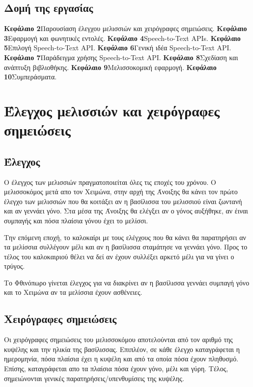 \documentclass[oneside, 12pt]{book}
\begin{document}
\section{Δομή της εργασίας}\label{sec:δομή-της-εργασίας}
\noindent
\textbf{Κεφάλαιο 2}\quad Παρουσίαση έλεγχου μελισσιών και χειρόγραφες σημειώσεις.\newline
\textbf{Κεφάλαιο 3}\quad Εφαρμογή και φωνητικές εντολές.\newline
\textbf{Κεφάλαιο 4}\quad Speech-to-Text APIs.\newline
\textbf{Κεφάλαιο 5}\quad Επιλογή Speech-to-Text API.\newline
\textbf{Κεφάλαιο 6}\quad Γενική ιδέα Speech-to-Text API.\newline
\textbf{Κεφάλαιο 7}\quad Παράδειγμα χρήσης Speech-to-Text API.\newline
\textbf{Κεφάλαιο 8}\quad Σχεδίαση και ανάπτυξη βιβλιοθήκης.\newline
\textbf{Κεφάλαιο 9}\quad Μελισσοκομική εφαρμογή.\newline
\textbf{Κεφάλαιο 10}\quad Συμπεράσματα.

\chapter{Έλεγχος μελισσιών και χειρόγραφες σημειώσεις}
\label{ch:έλεγχος-μελισσιών-και-χειρόγραφες-σημειώσεις}
\section{Έλεγχος}
\label{sec:έλεγχος}
Ο έλεγχος των μελισσιών πραγματοποιείται όλες τις εποχές του χρόνου.
Ο μελισσοκόμος μετά απο τον Χειμώνα, στην αρχή της Άνοιξης θα κάνει τον πρώτο έλεγχο των μελισσιών
που θα κοιτάξει αν η βασίλισσα του μελισσιού είναι ζωντανή και αν γεννάει γόνο.
Στα μέσα της Άνοιξης θα ελέγξει αν ο γόνος αυξήθηκε, αν έιναι συμπαγής και πόσα πλαίσια γόνου έχει το
μελίσσι.\par
Την επόμενη εποχή, το καλοκαίρι με τους ελέγχους που θα κάνει θα παρατηρήσει αν τα μελίσσια συλλέγουν
μέλι και αν η βασίλισσα σταμάτησε να γεννάει γόνο.
Προς το τέλος του καλοκαιριού θέλει να δεί αν έχουν συλλέξει αρκετό μέλι για να γίνει ο τρύγος.\par
Το Φθινόπωρο γίνεται έλεγχος για να διακρίνει αν η βασίλισσα γεννάει συμπαγή γόνο και το Χειμώνα αν
τα μελίσσια έχουν ασθένειες.
\section{Χειρόγραφες σημειώσεις}
\label{sec:χειρόγραφες-σημειώσεις}
Οι χειρόγραφες σημειώσεις του μελισσοκόμου αποτελούνται από τον αριθμό της κυψέλης και την ηλικία της
βασίλισσας.
Επιπλέον, σε κάθε έλεγχο καταγράφεται η ημερομηνία, πόσα πλαίσια έχει η κυψέλη και από τα
οποία πόσα έχουν πληθυσμό.
Επίσης, καταγράφεται απο τα πλαίσια πόσα έχουν γόνο, μέλι και γύρη.
Τέλος, σημειώνονται γενικές παρατηρήσεις/υπενθυμίσεις της κυψέλης.
\end{document}
